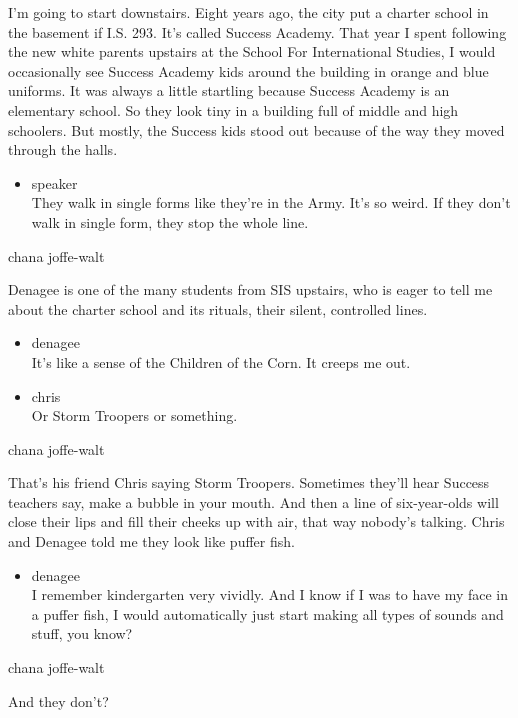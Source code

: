 I'm going to start downstairs. Eight years ago, the city put a charter
school in the basement if I.S. 293. It's called Success Academy. That
year I spent following the new white parents upstairs at the School For
International Studies, I would occasionally see Success Academy kids
around the building in orange and blue uniforms. It was always a little
startling because Success Academy is an elementary school. So they look
tiny in a building full of middle and high schoolers. But mostly, the
Success kids stood out because of the way they moved through the halls.

\begin{itemize}
\tightlist
\item
  speaker\\
  They walk in single forms like they're in the Army. It's so weird. If
  they don't walk in single form, they stop the whole line.
\end{itemize}

chana joffe-walt

Denagee is one of the many students from SIS upstairs, who is eager to
tell me about the charter school and its rituals, their silent,
controlled lines.

\begin{itemize}
\item
  denagee\\
  It's like a sense of the Children of the Corn. It creeps me out.
\item
  chris\\
  Or Storm Troopers or something.
\end{itemize}

chana joffe-walt

That's his friend Chris saying Storm Troopers. Sometimes they'll hear
Success teachers say, make a bubble in your mouth. And then a line of
six-year-olds will close their lips and fill their cheeks up with air,
that way nobody's talking. Chris and Denagee told me they look like
puffer fish.

\begin{itemize}
\tightlist
\item
  denagee\\
  I remember kindergarten very vividly. And I know if I was to have my
  face in a puffer fish, I would automatically just start making all
  types of sounds and stuff, you know?
\end{itemize}

chana joffe-walt

And they don't?

